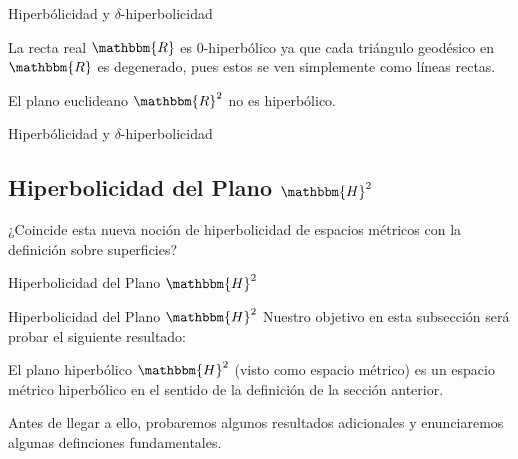 \documentclass[xcolor=dvipsnames]{beamer}
\theoremstyle{largebreak}
\newcommand{\bbm}[1]{\ensuremath{\mathbbm{#1}}}
\begin{document}
\begin{frame}{Hiperbólicidad y $\delta$-hiperbolicidad}
    \begin{exa}
        La recta real $\bbm{R}$ es $0$-hiperbólico ya que cada triángulo geodésico en $\bbm{R}$ es degenerado, pues estos se ven simplemente como líneas rectas.
    \end{exa}

    \begin{exa}
        El plano euclideano $\bbm{R}^2$ no es hiperbólico.
    \end{exa}
\end{frame}

\begin{frame}{Hiperbólicidad y $\delta$-hiperbolicidad}
\end{frame}

\subsection{Hiperbolicidad del Plano $\bbm{H}^2$}

\begin{frame}
    \begin{center}
        ¿Coincide esta nueva noción de hiperbolicidad de espacios métricos con la definición sobre superficies?
    \end{center}
\end{frame}

\begin{frame}
    \begin{center}
        Hiperbolicidad del Plano $\bbm{H}^2$
    \end{center}
\end{frame}

\begin{frame}{Hiperbolicidad del Plano $\bbm{H}^2$}
    Nuestro objetivo en esta subsección será probar el siguiente resultado:

    \begin{propo}
        El plano hiperbólico $\bbm{H}^2$ (visto como espacio métrico) es un espacio métrico hiperbólico en el sentido de la definición de la sección anterior.
    \end{propo}

    Antes de llegar a ello, probaremos algunos resultados adicionales y enunciaremos algunas definciones fundamentales.
\end{frame}
\end{document}
